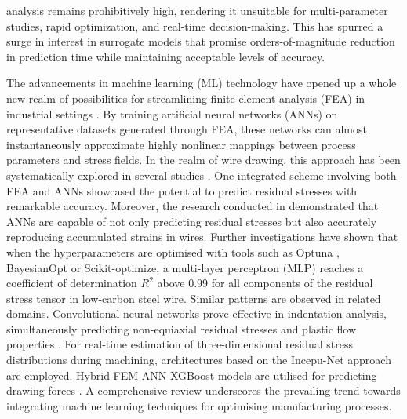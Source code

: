 \documentclass[subscriptcorrection,upint,varvw,barcolor=Goldenrod3,mathalfa=cal=euler,balance,hyphenate,french,pdf-a]{asmejour} %
\begin{document}
analysis remains prohibitively high, rendering it unsuitable for multi-parameter studies, rapid optimization, and real-time decision-making. This has spurred a surge in interest in surrogate models that promise orders-of-magnitude reduction in prediction time while maintaining acceptable levels of accuracy.

The advancements in machine learning (ML) technology have opened up a whole new realm of possibilities for streamlining finite element analysis (FEA) in industrial settings \citep{mozaffar2022mechanistic, goodfellow2016deep, weichert2019review}. By training artificial neural networks (ANNs) on representative datasets generated through FEA, these networks can almost instantaneously approximate highly nonlinear mappings between process parameters and stress fields.
In the realm of wire drawing, this approach has been systematically explored in several studies \citep{gromov2026residual,demin2025forecasting,demin2024application}. One integrated scheme involving both FEA and ANNs \citep{gromov2026residual} showcased the potential to predict residual stresses with remarkable accuracy. Moreover, the research conducted in \citep{demin2024application} demonstrated that ANNs are capable of not only predicting residual stresses but also accurately reproducing accumulated strains in wires.
Further investigations \citep{demin2025forecasting} have shown that when the hyperparameters are optimised with tools such as Optuna \citep{akiba2019optunanextgenerationhyperparameteroptimization}, BayesianOpt or Scikit-optimize, a multi-layer perceptron (MLP) reaches a coefficient of determination $R^2$ above 0.99 for all components of the residual stress tensor in low-carbon steel wire.
Similar patterns are observed in related domains. Convolutional neural networks prove effective in indentation analysis, simultaneously predicting non-equiaxial residual stresses and plastic flow properties \citep{park2026indentation, han2024evaluation}. For real-time estimation of three-dimensional residual stress distributions during machining, architectures based on the Incepu-Net approach \citep{wang2025online} are employed. Hybrid FEM-ANN-XGBoost models are utilised for predicting drawing forces \citep{tsui2026metrology}.
A comprehensive review \citep{weichert2019review} underscores the prevailing trend towards integrating machine learning techniques for optimising manufacturing processes.
\end{document}
